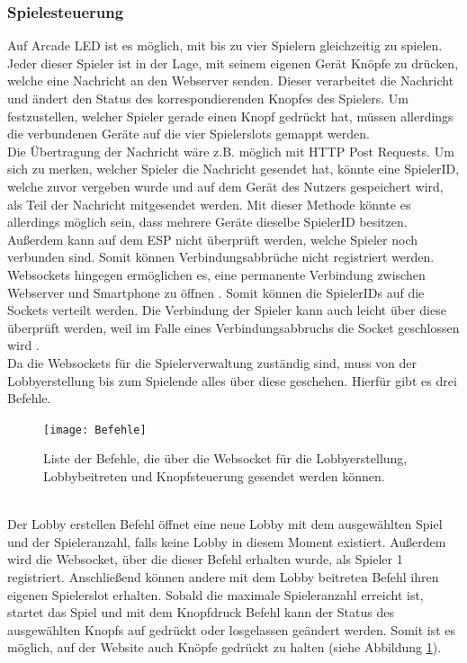 \documentclass[12pt,a4paper]{article}
\begin{document}
\subsubsection{Spielesteuerung}
Auf Arcade LED ist es möglich, mit bis zu vier Spielern gleichzeitig zu spielen. Jeder dieser Spieler ist in der Lage, mit seinem eigenen Gerät Knöpfe zu drücken, welche eine Nachricht an den Webserver senden. Dieser verarbeitet die Nachricht und ändert den Status des korrespondierenden Knopfes des Spielers. Um festzustellen, welcher Spieler gerade einen Knopf gedrückt hat, müssen allerdings die verbundenen Geräte auf die vier Spielerslots gemappt werden.
\vspace{1ex}\\
Die Übertragung der Nachricht wäre z.B. möglich mit HTTP Post Requests. Um sich zu merken, welcher Spieler die Nachricht gesendet hat, könnte eine SpielerID, welche zuvor vergeben wurde und auf dem Gerät des Nutzers gespeichert wird, als Teil der Nachricht mitgesendet werden. Mit dieser Methode könnte es allerdings möglich sein, dass mehrere Geräte dieselbe SpielerID besitzen. Außerdem kann auf dem ESP nicht überprüft werden, welche Spieler noch verbunden sind. Somit können Verbindungsabbrüche nicht registriert werden.
\vspace{1ex}\\
Websockets hingegen ermöglichen es, eine permanente Verbindung zwischen Webserver und Smartphone zu öffnen \cite{ESSPRESSIF:Reference}. Somit können die SpielerIDs auf die Sockets verteilt werden. Die Verbindung der Spieler kann auch leicht über diese überprüft werden, weil im Falle eines Verbindungsabbruchs die Socket geschlossen wird \cite{ESSPRESSIF:Reference}.
\vspace{1ex}\\
Da die Websockets für die Spielerverwaltung zuständig sind, muss von der Lobbyerstellung bis zum Spielende alles über diese geschehen. Hierfür gibt es drei Befehle.
\begin{figure}[h]
\centering
\texttt{[image: Befehle]}
\caption{\label{fig:Befehle}Liste der Befehle, die über die Websocket für die Lobbyerstellung, Lobbybeitreten und Knopfsteuerung gesendet werden können.}
\end{figure}
\vspace{1ex}\\
Der Lobby erstellen Befehl öffnet eine neue Lobby mit dem ausgewählten Spiel und der Spieleranzahl, falls keine Lobby in diesem Moment existiert. Außerdem wird die Websocket, über die dieser Befehl erhalten wurde, als Spieler 1 registriert. Anschließend können andere mit dem Lobby beitreten Befehl ihren eigenen Spielerslot erhalten. Sobald die maximale Spieleranzahl erreicht ist, startet das Spiel und mit dem Knopfdruck Befehl kann der Status des ausgewählten Knopfs auf \dq gedrückt\dq{} oder \dq losgelassen\dq{} geändert werden. Somit ist es möglich, auf der Website auch Knöpfe gedrückt zu halten (siehe Abbildung \ref{fig:Befehle}). 
\end{document}
